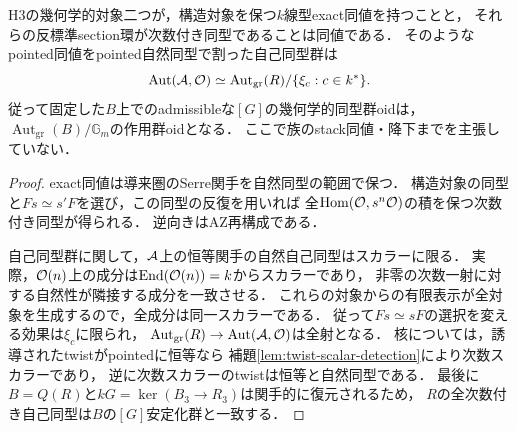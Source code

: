 \begin{proposition}[幾何学的対象の同型と次数スカラー]
\label{prop:intrinsic-ring-isomorphisms}
H3の幾何学的対象二つが，構造対象を保つ$k$線型exact同値を持つことと，
それらの反標準section環が次数付き同型であることは同値である．
そのようなpointed同値をpointed自然同型で割った自己同型群は
\[
 \operatorname{Aut}(\mathcal A,\mathcal O)
 \simeq\operatorname{Aut}_{\mathrm{gr}}(R)/\{\xi_c:c\in k^*\}.
\]
従って固定した$B$上でのadmissibleな$[G]$の幾何学的同型群oidは，
$\operatorname{Aut}_{\mathrm{gr}}(B)/\mathbb G_m$の作用群oidとなる．
ここで族のstack同値・降下までを主張していない．
\end{proposition}
\begin{proof}
exact同値は導来圏のSerre関手を自然同型の範囲で保つ．
構造対象の同型と$Fs\simeq s'F$を選び，この同型の反復を用いれば
全$\operatorname{Hom}(\mathcal O,s^n\mathcal O)$の積を保つ次数付き同型が得られる．
逆向きはAZ再構成である．

自己同型群に関して，$\mathcal A$上の恒等関手の自然自己同型はスカラーに限る．
実際，$\mathcal O(n)$上の成分は$\operatorname{End}(\mathcal O(n))=k$からスカラーであり，
非零の次数一射に対する自然性が隣接する成分を一致させる．
これらの対象からの有限表示が全対象を生成するので，全成分は同一スカラーである．
従って$Fs\simeq sF$の選択を変える効果は$\xi_c$に限られ，
$\operatorname{Aut}_{\mathrm{gr}}(R)\to\operatorname{Aut}(\mathcal A,\mathcal O)$は全射となる．
核については，誘導されたtwistがpointedに恒等なら
補題\ref{lem:twist-scalar-detection}により次数スカラーであり，
逆に次数スカラーのtwistは恒等と自然同型である．
最後に$B=Q(R)$と$kG=\ker(B_3\to R_3)$は関手的に復元されるため，
$R$の全次数付き自己同型は$B$の$[G]$安定化群と一致する．
\end{proof}
